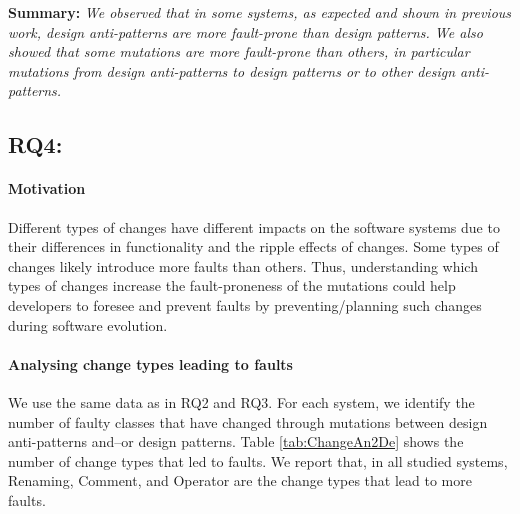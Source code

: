 \begin{tcolorbox}
\vspace{-0.1cm}
\textbf{Summary:} \emph{We observed that in some systems, as expected and shown in previous work, design anti-patterns are more fault-prone than design patterns. We also showed that some mutations are more fault-prone than others, in particular mutations from design anti-patterns to design patterns or to other design anti-patterns.}
\vspace{-0.1cm}
\end{tcolorbox}



\subsection{\textbf{RQ4:} \textit{\RQFour}}

\paragraph{\textbf{Motivation}} Different types of changes have different impacts on the software systems due to their differences in functionality and the ripple effects of changes. Some types of changes likely introduce more faults than others. Thus, understanding which types of changes increase the fault-proneness of the mutations could help developers to foresee and prevent faults by preventing/planning such changes during software evolution.

\paragraph{\textbf{Analysing change types leading to faults}} We use the same data as in RQ2 and RQ3. For each system, we identify the number of faulty classes that have changed through mutations between design anti-patterns and--or design patterns. Table \ref{tab:ChangeAn2De} shows the number of change types that led to faults. We report that, in all studied systems, Renaming, Comment, and Operator are the change types that lead to more faults.

